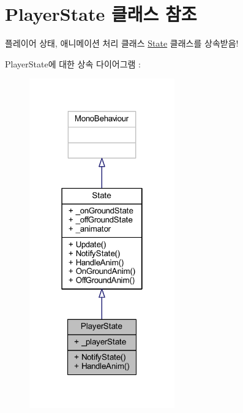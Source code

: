 \hypertarget{class_player_state}{}\section{Player\+State 클래스 참조}
\label{class_player_state}


플레이어 상태, 애니메이션 처리 클래스 \mbox{\hyperlink{class_state}{State}} 클래스를 상속받음!  




Player\+State에 대한 상속 다이어그램 \+: \nopagebreak
\begin{figure}[H]
\begin{center}
\leavevmode
\includegraphics[width=178pt]{d1/dd1/class_player_state__inherit__graph}
\end{center}
\end{figure}


